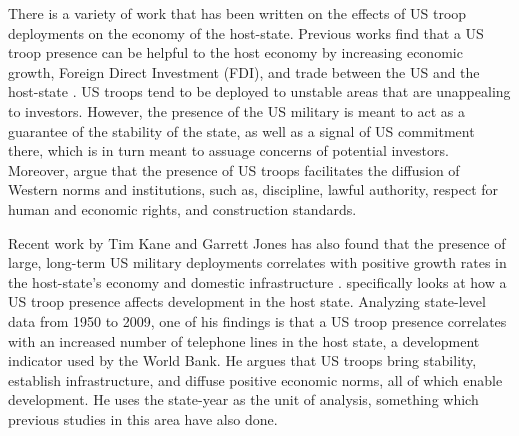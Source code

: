 \documentclass[12pt]{article}
\begin{document}
\begin{doublespace}

There is a variety of work that has been written on the effects of US troop deployments on the economy of the host-state. Previous works find that a US troop presence can be helpful to the host economy by increasing economic growth, Foreign Direct Investment (FDI), and trade between the US and the host-state \cite{biglaiser2007following,biglaiser2009interdependence,jones2012us}. US troops tend to be deployed to unstable areas that are unappealing to investors. However, the presence of the US military is meant to act as a guarantee of the stability of the state, as well as a signal of US commitment there, which is in turn meant to assuage concerns of potential investors. Moreover,  argue that the presence of US troops facilitates the diffusion of Western norms and institutions, such as, discipline, lawful authority, respect for human and economic rights, and construction standards. 
  

Recent work by Tim Kane and Garrett Jones has also found that the presence of large, long-term US military deployments correlates with positive growth rates in the host-state's economy and domestic infrastructure \cite{kane2012development,jones2012us}.  specifically looks at how a US troop presence affects development in the host state. Analyzing state-level data from 1950 to 2009, one of his findings is that a US troop presence correlates with an increased number of telephone lines in the host state, a development indicator used by the World Bank. He argues that US troops bring stability, establish infrastructure, and diffuse positive economic norms, all of which enable development. He uses the state-year as the unit of analysis, something which previous studies in this area have also done.



\end{doublespace}
\end{document}
